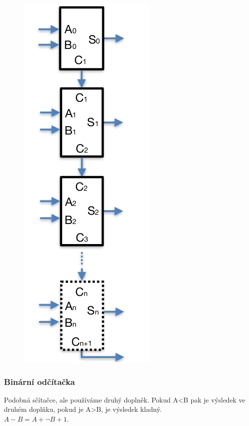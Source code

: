 \begin{figure}[h!]
    \centering
    \includegraphics[scale=0.3]{img/Ripple-carry.png}
\end{figure}

\subsubsection{Binární odčítačka}
Podobná sčítačce, ale používáme druhý doplněk. Pokud A<B pak je výsledek ve druhém doplňku, pokud je A>B, je výsledek kladný.\\
\(A-B = A + \lnot B + 1\).\\

